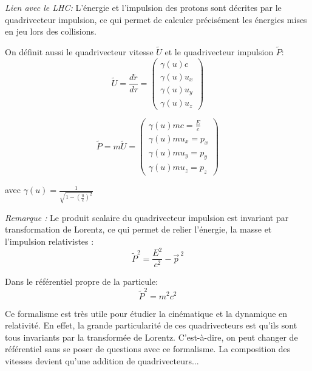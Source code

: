 \documentclass[14pt]{article}
\begin{document}
\textit{Lien avec le LHC:} L'énergie et l'impulsion des protons sont décrites par le quadrivecteur impulsion, ce qui permet de calculer précisément les énergies mises en jeu lors des collisions.

On définit aussi le quadrivecteur vitesse $\tilde{U}$ et le quadrivecteur impulsion $\tilde{P}$:
\begin{equation} \label{eq:4.2}
    \tilde{U} = \frac{d\tilde{r}}{d\tau} = \begin{pmatrix}
        \gamma(u) c \\
        \gamma(u) u_x \\
        \gamma(u) u_y \\
        \gamma(u) u_z
    \end{pmatrix}
    \tag{4.2}
\end{equation}

\begin{equation}\label{eq:4.3}
    \tilde{P} = m \tilde{U} = \begin{pmatrix}
        \gamma(u) m c = \frac{E}{c}\\
        \gamma(u) m u_x = p_x\\
        \gamma(u) m u_y = p_y\\
        \gamma(u) m u_z = p_z
    \end{pmatrix}
    \tag{4.3}
\end{equation}

avec $\gamma(u)= \frac{1}{\sqrt{1-(\frac{u}{c})^2}}$

\textit{Remarque :} Le produit scalaire du quadrivecteur impulsion est invariant par transformation de Lorentz, ce qui permet de relier l'énergie, la masse et l'impulsion relativistes :
\begin{equation}\label{eq:4.3.1}
    \tilde{P}^2 = \frac{E^2}{c^2} - \vec{p}^{\ 2}
    \tag{4.3.1}
\end{equation}

Dans le référentiel propre de la particule:
\begin{equation}\label{eq:4.3.2}
    \tilde{P}^2 = m^2 c^2
    \tag{4.3.2}
\end{equation}

Ce formalisme est très utile pour étudier la cinématique et la dynamique en relativité. En effet, la grande particularité de ces quadrivecteurs est qu'ils sont tous invariants par la transformée de Lorentz. C'est-à-dire, on peut changer de référentiel sans se poser de questions avec ce formalisme. La composition des vitesses devient qu'une addition de quadrivecteurs...
\end{document}
